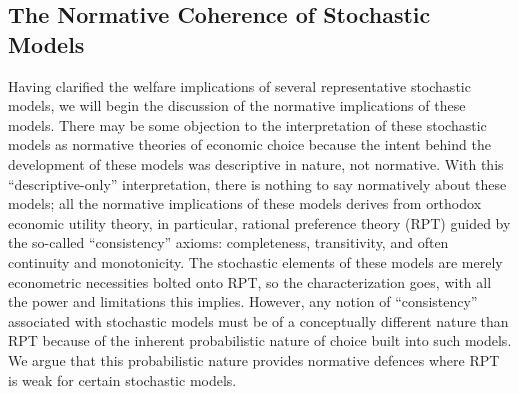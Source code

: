 \documentclass[11pt,a4paper]{article}
\begin{document}
\subsection{The Normative Coherence of Stochastic Models}

Having clarified the welfare implications of several representative stochastic models, we will begin the discussion of the normative implications of these models.
There may be some objection to the interpretation of these stochastic models as normative theories of economic choice because the intent behind the development of these models was descriptive in nature, not normative.
With this \enquote{descriptive-only} interpretation, there is nothing to say normatively about these models;
all the normative implications of these models derives from orthodox economic utility theory, in particular, rational preference theory (RPT) guided by the so-called \enquote{consistency}{\footnotemark} axioms: completeness, transitivity, and often{\footnotemark} continuity and monotonicity.
The stochastic elements of these models are merely econometric necessities bolted onto RPT, so the characterization goes, with all the power and limitations this implies.
However, any notion of \enquote{consistency} associated with stochastic models must be of a conceptually different nature than RPT because of the inherent probabilistic nature of choice built into such models.
We argue that this probabilistic nature provides normative defences where RPT is weak for certain stochastic models.

\addtocounter{footnote}{-2}
\end{document}
